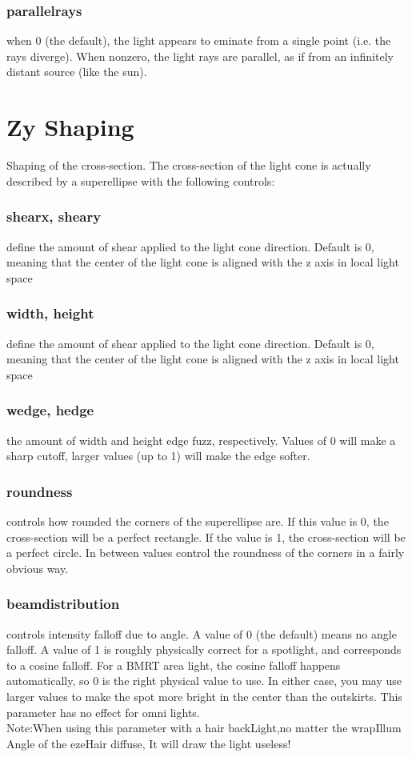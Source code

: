 \documentclass[final,letterpaper,twoside,12pt]{report}
\begin{document}
\subsubsection {parallelrays }
when 0 (the default), the light appears to eminate  from a single point (i.e. the rays diverge).  When nonzero,  the light rays are parallel, as if from an infinitely distant  source (like the sun).
\smallskip

\section {Zy Shaping}
Shaping of the cross-section.  The cross-section of the light cone is actually described by a superellipse with the following controls:
\subsubsection {shearx, sheary}
define the amount of shear applied to the light  cone direction.  Default is 0, meaning that the center of the  light cone is aligned with the z axis in local light space
\smallskip
\subsubsection {width, height}
define the amount of shear applied to the light  cone direction.  Default is 0, meaning that the center of the  light cone is aligned with the z axis in local light space
\smallskip
\subsubsection {wedge, hedge}
the amount of width and height edge fuzz,  respectively.  Values of 0 will make a sharp cutoff, larger  values (up to 1) will make the edge softer.
\smallskip
\subsubsection {roundness}
controls how rounded the corners of the superellipse  are.  If this value is 0, the cross-section will be a perfect  rectangle.  If the value is 1, the cross-section will be a  perfect circle.  In between values control the roundness of  the corners in a fairly obvious way.
\smallskip
\subsubsection {beamdistribution }
controls intensity falloff due to angle.  A value of 0 (the default) means no angle falloff.  A value of 1 is roughly physically correct for a spotlight, and  corresponds to a cosine falloff.  For a BMRT area light, the cosine falloff happens automatically, so 0 is the right physical  value to use.  In either case, you may use larger values to  make the spot more bright in the center than the outskirts.  This parameter has no effect for omni lights.
\\
Note:When using this parameter with a hair backLight,no matter the wrapIllum Angle of the ezeHair diffuse, It will draw the light useless! 
\smallskip
\end{document}

